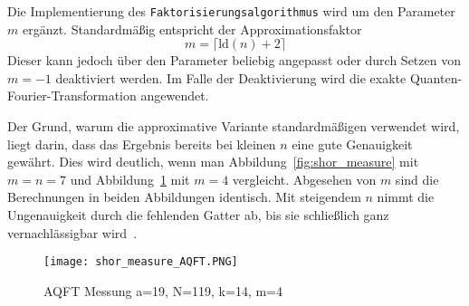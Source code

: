 Die Implementierung des \texttt{Faktorisierungsalgorithmus} wird um den Parameter \(m\) ergänzt.
Standardmäßig entspricht der Approximationsfaktor 
\[m = \lceil\text{ld}(n)+2\rceil\]  
Dieser kann jedoch über den Parameter beliebig angepasst oder 
durch Setzen von \(m=-1\) deaktiviert werden.
Im Falle der Deaktivierung wird die exakte Quanten-Fourier-Transformation angewendet.

Der Grund, warum die approximative Variante standardmäßigen verwendet wird, 
liegt darin, dass das Ergebnis bereits bei kleinen \(n\) eine gute Genauigkeit gewährt. 
Dies wird deutlich, wenn man Abbildung~\ref{fig:shor_measure} mit \(m=n=7\) und
Abbildung~\ref{fig:shor_measure_AQFT} mit \(m=4\) vergleicht.
Abgesehen von \(m\) sind die Berechnungen in beiden Abbildungen identisch.
Mit steigendem \(n\) nimmt die Ungenauigkeit durch die fehlenden Gatter ab, 
bis sie schließlich ganz vernachlässigbar wird~\cite{cheung2004improved}.

\begin{figure}[H]
  \centering
  \texttt{[image: shor\_measure\_AQFT.PNG]}
  \caption{AQFT Messung a=19, N=119, k=14, m=4}
  \label{fig:shor_measure_AQFT}
\end{figure}
